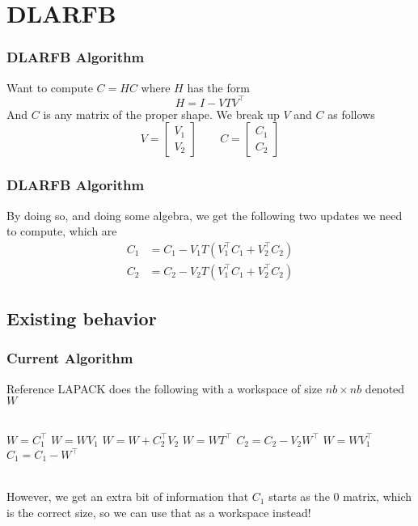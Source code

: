 \documentclass[12pt]{beamer}
\begin{document}
    \section{DLARFB}
    \begin{frame}
        \frametitle{DLARFB Algorithm}
        Want to compute $C = HC$ where $H$ has the form
        $$
        H = I - VTV^\top
        $$
        And $C$ is any matrix of the proper shape. We break up $V$ and $C$ as follows
        $$
            V = \begin{bmatrix}
                V_1\\
                V_2
            \end{bmatrix} \qquad
            C = \begin{bmatrix}
                C_1\\
                C_2
            \end{bmatrix}
        $$
    \end{frame}
    \begin{frame}
        \frametitle{DLARFB Algorithm}
        By doing so, and doing some algebra, we get the following two updates we need to compute, which are
        \begin{align*}
            C_1 &= C_1 - V_1T\left(V_1^\top C_1 + V_2^\top C_2\right) \\
            C_2 &= C_2 - V_2T\left(V_1^\top C_1 + V_2^\top C_2\right)
        \end{align*}
    \end{frame}
    \subsection{Existing behavior}
    \begin{frame}
        \frametitle{Current Algorithm}
        Reference LAPACK does the following with a workspace of size $nb\times nb$ denoted $W$\\\,\\
        \begin{algorithmic}
            \State $W = C_1^\top$
            \State $W = WV_1$
            \State $W = W + C_2^\top V_2$
            \State $W = WT^\top$
            \State $C_2 = C_2 - V_2W^\top$
            \State $W = WV_1^\top$
            \State $C_1 = C_1 - W^\top$
        \end{algorithmic}\,\\
        However, we get an extra bit of information that $C_1$ starts as the $0$ matrix, which is the correct
        size, so we can use that as a workspace instead!
    \end{frame}
\end{document}
